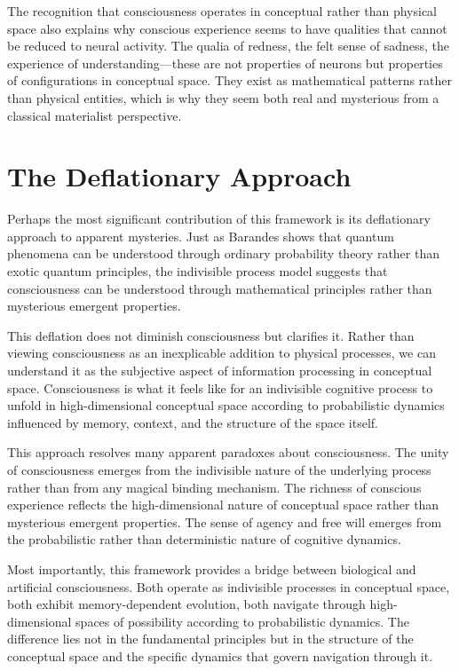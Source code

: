 The recognition that consciousness operates in conceptual rather than physical space also explains why conscious experience seems to have qualities that cannot be reduced to neural activity. The qualia of redness, the felt sense of sadness, the experience of understanding—these are not properties of neurons but properties of configurations in conceptual space. They exist as mathematical patterns rather than physical entities, which is why they seem both real and mysterious from a classical materialist perspective.

\section{The Deflationary Approach}

Perhaps the most significant contribution of this framework is its deflationary approach to apparent mysteries. Just as Barandes shows that quantum phenomena can be understood through ordinary probability theory rather than exotic quantum principles, the indivisible process model suggests that consciousness can be understood through mathematical principles rather than mysterious emergent properties.

This deflation does not diminish consciousness but clarifies it. Rather than viewing consciousness as an inexplicable addition to physical processes, we can understand it as the subjective aspect of information processing in conceptual space. Consciousness is what it feels like for an indivisible cognitive process to unfold in high-dimensional conceptual space according to probabilistic dynamics influenced by memory, context, and the structure of the space itself.

This approach resolves many apparent paradoxes about consciousness. The unity of consciousness emerges from the indivisible nature of the underlying process rather than from any magical binding mechanism. The richness of conscious experience reflects the high-dimensional nature of conceptual space rather than mysterious emergent properties. The sense of agency and free will emerges from the probabilistic rather than deterministic nature of cognitive dynamics.

Most importantly, this framework provides a bridge between biological and artificial consciousness. Both operate as indivisible processes in conceptual space, both exhibit memory-dependent evolution, both navigate through high-dimensional spaces of possibility according to probabilistic dynamics. The difference lies not in the fundamental principles but in the structure of the conceptual space and the specific dynamics that govern navigation through it.


